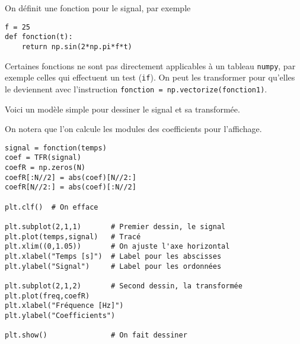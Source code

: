 On définit une fonction pour le signal, par exemple

\begin{lstlisting}
f = 25
def fonction(t):
    return np.sin(2*np.pi*f*t)
\end{lstlisting}

Certaines fonctions ne sont pas directement applicables à un tableau {\tt numpy}, par exemple celles qui effectuent un test ({\tt if}). On peut les transformer pour qu'elles le deviennent avec l'instruction {\tt fonction = np.vectorize(fonction1)}.

Voici un modèle simple pour dessiner le signal et sa transformée.

On notera que l'on calcule les modules des coefficients pour l'affichage.

\begin{lstlisting}
signal = fonction(temps)
coef = TFR(signal)
coefR = np.zeros(N)
coefR[:N//2] = abs(coef)[N//2:]
coefR[N//2:] = abs(coef)[:N//2]

plt.clf()  # On efface

plt.subplot(2,1,1)       # Premier dessin, le signal
plt.plot(temps,signal)   # Tracé
plt.xlim((0,1.05))       # On ajuste l'axe horizontal
plt.xlabel("Temps [s]")  # Label pour les abscisses
plt.ylabel("Signal")     # Label pour les ordonnées

plt.subplot(2,1,2)       # Second dessin, la transformée
plt.plot(freq,coefR)
plt.xlabel("Fréquence [Hz]")
plt.ylabel("Coefficients")

plt.show()               # On fait dessiner
\end{lstlisting}

